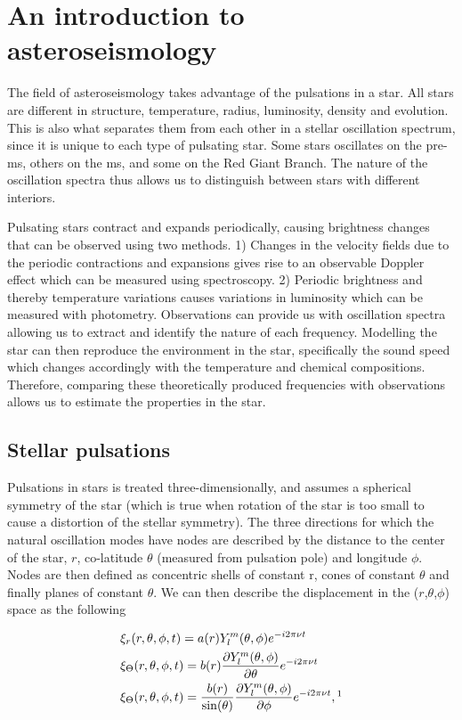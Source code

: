 \chapter{An introduction to asteroseismology}
\label{chap:asteroseismology}

 The field of asteroseismology takes advantage of the pulsations in a star. All stars are different in structure, temperature, radius, luminosity, density and evolution. This is also what separates them from each other in a stellar oscillation spectrum, since it is unique to each type of pulsating star. Some stars oscillates on the pre- ms, others on the ms, and some on the Red Giant Branch. The nature of the oscillation spectra thus allows us to distinguish between stars with different interiors.  
 
Pulsating stars contract and expands periodically, causing brightness changes that can be observed using two methods. 1) Changes in the velocity fields due to the periodic contractions and expansions gives rise to an observable Doppler effect which can be measured using spectroscopy. 2) Periodic brightness and thereby temperature variations causes variations in luminosity which can be measured with photometry. Observations can provide us with oscillation spectra allowing us to extract and identify the nature of each frequency. Modelling the star can then reproduce the environment in the star, specifically the sound speed which changes accordingly with the temperature and chemical compositions. Therefore, comparing these theoretically produced frequencies with observations allows us to estimate the properties in the star.  

\section{Stellar pulsations}

Pulsations in stars is treated three-dimensionally, and assumes a spherical symmetry of the star (which is true when rotation of the star is too small to cause a distortion of the stellar symmetry). The three directions for which the natural oscillation modes have nodes are described by the distance to the center of the star, $r$, co-latitude $\theta$ (measured from pulsation pole) and longitude $\phi$. Nodes are then defined as concentric shells of constant r, cones of constant $\theta$ and finally planes of constant $\theta$. We can then describe the displacement in the ($r$,$\theta$,$\phi$) space as the following

\begin{align}
    & \xi_r(r,\theta,\phi,t) = a(r)Y^{m}_l(\theta,\phi)e^{-i2\pi\nu t}  \\
    & \xi_\Theta(r,\theta,\phi,t) = b(r)\frac{\partial Y^{m}_l(\theta,\phi)}{\partial \theta}e^{-i2\pi\nu t}  \\
    & \xi_\Theta(r,\theta,\phi,t) = \frac{b(r)}{\sin(\theta)}\frac{\partial Y^{m}_l(\theta,\phi)}{\partial \phi}e^{-i2\pi\nu t},
    \footnotemark{}
\end{align}

